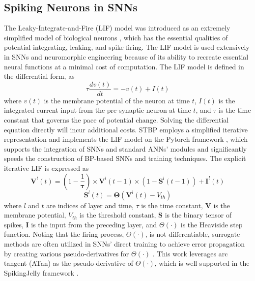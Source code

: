 \documentclass[letterpaper]{article} \usepackage[submission]{aaai23}  \usepackage{times}  \usepackage{helvet}  \usepackage{courier}  \usepackage[hyphens]{url}  \usepackage{graphicx} \urlstyle{rm} \def\UrlFont{\rm}  \usepackage{natbib}  \usepackage{caption} \frenchspacing  \setlength{\pdfpagewidth}{8.5in} \setlength{\pdfpageheight}{11in} \usepackage{algorithm}
\begin{document}
\subsection{Spiking Neurons in SNNs}
The Leaky-Integrate-and-Fire (LIF) model was introduced as an extremely simplified model of biological neurons \cite{dayan_theoretical_2005}, which has the essential qualities of potential integrating, leaking, and spike firing. 
The LIF model is used extensively in SNNs and neuromorphic engineering because of its ability to recreate essential neural functions at a minimal cost of computation.
The LIF model is defined in the differential form, as
\begin{equation}
    \tau\frac{dv(t)}{dt} = - v(t)  + I(t)
\end{equation}
where $v(t)$ is the membrane potential of the neuron at time $t$, $I(t)$ is the integrated current input from the pre-synaptic neuron at time $t$, and $\tau$ is the time constant that governs the pace of potential change.
Solving the differential equation directly will incur additional costs. STBP \cite{wu_spatio-temporal_2018} employs a simplified iterative representation and implements the LIF model on the Pytorch framework \cite{paszke_pytorch_2019}, which supports the integration of SNNs and standard ANNs' modules and significantly speeds the construction of BP-based SNNs and training techniques. The explicit iterative LIF is expressed as
\begin{equation}
\mathbf{V}^{l}\left( t \right) = \left( {1 - \frac{1}{\mathbf{\tau}}} \right) \times \mathbf{V}^{l}\left( {t - 1} \right) \times \left( {1 - \mathbf{S}^{l}\left( { t - 1} \right)} \right) + \mathbf{I}^{l}\left( t \right)    
\end{equation}
\begin{equation}
\mathbf{S}^{l}\left( t\right) = \mathbf{\Theta}\left( \mathbf{V}^{l}\left( t \right) - V_{th} \right)
\end{equation}
where $l$ and $t$ are indices of layer and time, $\tau$ is the time constant, $\mathbf{V}$ is the membrane potential, $V_{th}$ is the threshold constant, $\mathbf{S}$ is the binary tensor of spikes, $\mathbf{I}$ is the input from the preceding layer, and ${\Theta} (\cdot)$ is the Heaviside step function.
Noting that the firing process, ${\Theta} (\cdot)$, is not differentiable, surrogate methods are often utilized in SNNs' direct training to achieve error propagation by creating various pseudo-derivatives for ${\Theta} (\cdot)$ \cite{neftci_surrogate_2019}. 
This work leverages arc tangent (ATan) as the pseudo-derivative of ${\Theta} (\cdot)$, which is well supported in the SpikingJelly framework \cite{SpikingJelly}. 
\end{document}
